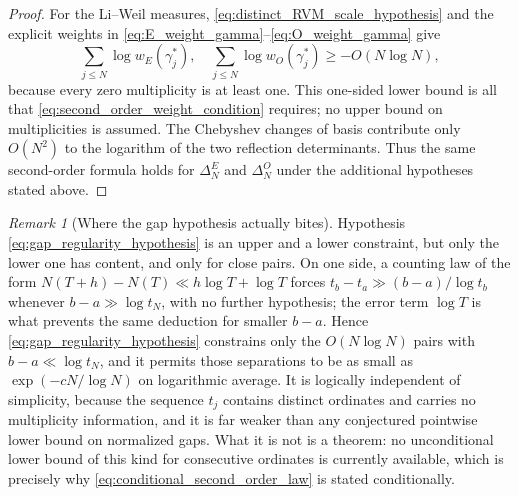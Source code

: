 \documentclass[preprint,12pt]{elsarticle}
\numberwithin{equation}{section}
\theoremstyle{plain}
\theoremstyle{definition}
\theoremstyle{remark}
\newtheorem{remark}[theorem]{Remark}
\begin{document}
\begin{proof}
For the Li--Weil measures, \eqref{eq:distinct_RVM_scale_hypothesis} and the explicit weights in \eqref{eq:E_weight_gamma}--\eqref{eq:O_weight_gamma} give
\begin{equation}
\sum_{j\le N}\log w_{E}(\gamma_j^*),
\quad
\sum_{j\le N}\log w_{O}(\gamma_j^*)
\ge -O(N\log N),
\end{equation}
because every zero multiplicity is at least one.  This one-sided lower bound is all that
\eqref{eq:second_order_weight_condition} requires; no upper bound on multiplicities is assumed.  The Chebyshev changes of basis contribute only $O(N^2)$ to the logarithm of the two reflection determinants.  Thus the same second-order formula holds for $\Delta_N^E$ and $\Delta_N^O$ under the additional hypotheses stated above.
\end{proof}

\begin{remark}[Where the gap hypothesis actually bites]
\label{rem:gap_hypothesis_localised}
Hypothesis \eqref{eq:gap_regularity_hypothesis} is an upper and a lower constraint, but only the lower one has content, and only for close pairs. On one side, a counting law of the form $N(T+h)-N(T)\ll h\log T+\log T$ forces $t_b-t_a\gg(b-a)/\log t_b$ whenever $b-a\gg\log t_N$, with no further hypothesis; the error term $\log T$ is what prevents the same deduction for smaller $b-a$. Hence \eqref{eq:gap_regularity_hypothesis} constrains only the $O(N\log N)$ pairs with $b-a\ll\log t_N$, and it permits those separations to be as small as $\exp(-cN/\log N)$ on logarithmic average. It is logically independent of simplicity, because the sequence \(t_j\) contains distinct ordinates and carries no multiplicity information, and it is far weaker than any conjectured pointwise lower bound on normalized gaps. What it is not is a theorem: no unconditional lower bound of this kind for consecutive ordinates is currently available, which is precisely why \eqref{eq:conditional_second_order_law} is stated conditionally.
\end{remark}
\end{document}
